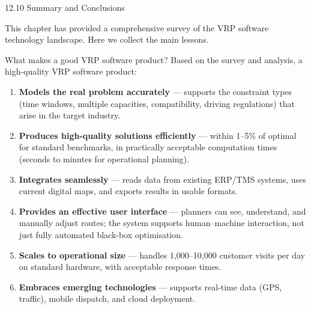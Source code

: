 \documentclass[aspectratio=169,10pt]{beamer}
\begin{document}
\begin{frame}[allowframebreaks]{12.10 \; Summary and Conclusions}

  This chapter has provided a comprehensive survey of the VRP software
  technology landscape.
  Here we collect the main lessons.

  \begin{block}{What makes a good VRP software product?}
    Based on the survey and analysis, a high-quality VRP software product:
    \begin{enumerate}
      \item \textbf{Models the real problem accurately} ---
            supports the constraint types (time windows, multiple capacities,
            compatibility, driving regulations) that arise in the target
            industry.
      \item \textbf{Produces high-quality solutions efficiently} ---
            within 1--5\% of optimal for standard benchmarks,
            in practically acceptable computation times
            (seconds to minutes for operational planning).
      \item \textbf{Integrates seamlessly} ---
            reads data from existing ERP/TMS systems, uses current
            digital maps, and exports results in usable formats.
      \item \textbf{Provides an effective user interface} ---
            planners can see, understand, and manually adjust routes;
            the system supports human--machine interaction, not just
            fully automated black-box optimisation.
      \item \textbf{Scales to operational size} ---
            handles 1,000--10,000 customer visits per day on
            standard hardware, with acceptable response times.
      \item \textbf{Embraces emerging technologies} ---
            supports real-time data (GPS, traffic), mobile dispatch,
            and cloud deployment.
    \end{enumerate}
  \end{block}

  \framebreak


\end{frame}
\end{document}
